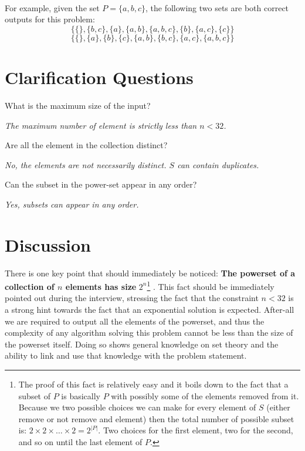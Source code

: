 \begin{example}
	\hfill \\
	For example, given the set $P=\{a,b,c\}$, the following two sets are both correct outputs for
	this problem:
	\begin{equation*}
		\{\{\}, \{b,c\}, \{a\}, \{a,b\}, \{a,b,c\}, \{b\}, \{a,c\}, \{c\} \}
	\end{equation*}
	\begin{equation*}
		\{\{\}, \{a\}, \{b\}, \{c\}, \{a,b\}, \{b,c\}, \{a,c\}, \{a,b,c\} \}
	\end{equation*}
	
\end{example}

\section{Clarification Questions}

\begin{QandA}
	\item What is the maximum size of the input?
	\begin{answered}
		\textit{The maximum number of element is strictly less than $n < 32$.}
	\end{answered}
	
	\item Are all the element in the collection distinct?
	\begin{answered}
		\textit{No, the elements are not necessarily distinct. $S$ can contain duplicates.}
	\end{answered}

	\item Can the subset in the power-set appear in any order?
	\begin{answered}
		\textit{Yes, subsets can appear in any order.}
	\end{answered}
\end{QandA}

\section{Discussion}
There is one key point that should immediately be noticed: \textbf{The powerset of a collection of
	$n$ elements has size} $\boxed{2^n}$\footnote{The proof of this fact is relatively easy and it boils
	down to the fact that a subset of $P$ is basically $P$ with possibly some of the elements
	removed from it. Because we two possible choices we can make for every element of $S$ (either
	remove or not remove and element) then the total number of possible subset is: $2 \times 2
	\times \ldots \times 2 = 2^{|P|}$. Two choices for the first element, two for the second, and so
	on until the last element of $P$.} . This fact should be immediately pointed out during the
	interview, stressing the fact that the constraint $n < 32$ is a strong hint towards the fact
	that an exponential solution is expected. After-all we are required to output all the elements
	of the powerset, and thus the complexity of any algorithm solving this problem cannot be less
	than the size of the powerset itself. Doing so shows general knowledge on set theory and the
	ability to link and use that knowledge with the problem statement.


